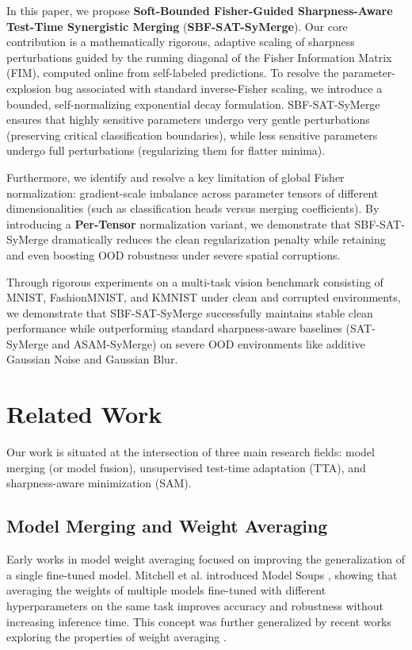\documentclass{article}
\theoremstyle{plain}
\theoremstyle{definition}
\theoremstyle{remark}
\begin{document}
In this paper, we propose \textbf{Soft-Bounded Fisher-Guided Sharpness-Aware Test-Time Synergistic Merging} (\textbf{SBF-SAT-SyMerge}). Our core contribution is a mathematically rigorous, adaptive scaling of sharpness perturbations guided by the running diagonal of the Fisher Information Matrix (FIM), computed online from self-labeled predictions. To resolve the parameter-explosion bug associated with standard inverse-Fisher scaling, we introduce a bounded, self-normalizing exponential decay formulation. SBF-SAT-SyMerge ensures that highly sensitive parameters undergo very gentle perturbations (preserving critical classification boundaries), while less sensitive parameters undergo full perturbations (regularizing them for flatter minima).

Furthermore, we identify and resolve a key limitation of global Fisher normalization: gradient-scale imbalance across parameter tensors of different dimensionalities (such as classification heads versus merging coefficients). By introducing a \textbf{Per-Tensor} normalization variant, we demonstrate that SBF-SAT-SyMerge dramatically reduces the clean regularization penalty while retaining and even boosting OOD robustness under severe spatial corruptions.

Through rigorous experiments on a multi-task vision benchmark consisting of MNIST, FashionMNIST, and KMNIST under clean and corrupted environments, we demonstrate that SBF-SAT-SyMerge successfully maintains stable clean performance while outperforming standard sharpness-aware baselines (SAT-SyMerge and ASAM-SyMerge) on severe OOD environments like additive Gaussian Noise and Gaussian Blur.

\section{Related Work}
\label{sec:related}

Our work is situated at the intersection of three main research fields: model merging (or model fusion), unsupervised test-time adaptation (TTA), and sharpness-aware minimization (SAM).

\subsection{Model Merging and Weight Averaging}
Early works in model weight averaging focused on improving the generalization of a single fine-tuned model. Mitchell et al. introduced Model Soups \cite{wortsman2022model_1}, showing that averaging the weights of multiple models fine-tuned with different hyperparameters on the same task improves accuracy and robustness without increasing inference time. This concept was further generalized by recent works exploring the properties of weight averaging \cite{motyka2025is, kim2024methodology, croce2023seasoning}.
\end{document}
